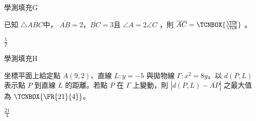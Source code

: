     \begin{QUESTION}
        \begin{ExamInfo}{99}{學測}{填充}{G}
        \end{ExamInfo}
        \begin{ExamAnsRateInfo}{25}{58}{14}{3}
        \end{ExamAnsRateInfo}
        \begin{QBODY}
            已知 $\triangle ABC$中， $\overline{AB}=2$，$\overline{BC}=3$且 $\angle A=2 \angle C$ ，則 $\overline{AC}=\TCNBOX{\frac{\TCN}{\TCN}}$ 。
        \end{QBODY}
        \begin{QFROMS}
        \end{QFROMS}
        \begin{QTAGS}\end{QTAGS}
        \begin{QANS}
            $\frac{5}{2}$
        \end{QANS}
        \begin{QSOLLIST}
        \end{QSOLLIST}
        \begin{QEMPTYSPACE}
        \end{QEMPTYSPACE}
    \end{QUESTION}
    \begin{QUESTION}
        \begin{ExamInfo}{99}{學測}{填充}{H}
        \end{ExamInfo}
        \begin{ExamAnsRateInfo}{10}{27}{2}{1}
        \end{ExamAnsRateInfo}
        \begin{QBODY}
            坐標平面上給定點 $A(9,2)$、直線 $L:y=-5$ 與拋物線 $\Gamma:x^2 =8y$。以 $d(P,L)$ 表示點 $P$ 到直線 $L$ 的距離。若點 $P$ 在 $\Gamma$ 上變動，則 $|d(P,L)-\overline{AP}|$ 之最大值為 $\TCNBOX{\FR{21}{4}}$。
        \end{QBODY}
        \begin{QFROMS}
        \end{QFROMS}
        \begin{QTAGS}\end{QTAGS}
        \begin{QANS}
            $\frac{21}{4}$
        \end{QANS}
        \begin{QSOLLIST}
        \end{QSOLLIST}
        \begin{QEMPTYSPACE}
        \end{QEMPTYSPACE}
    \end{QUESTION}
